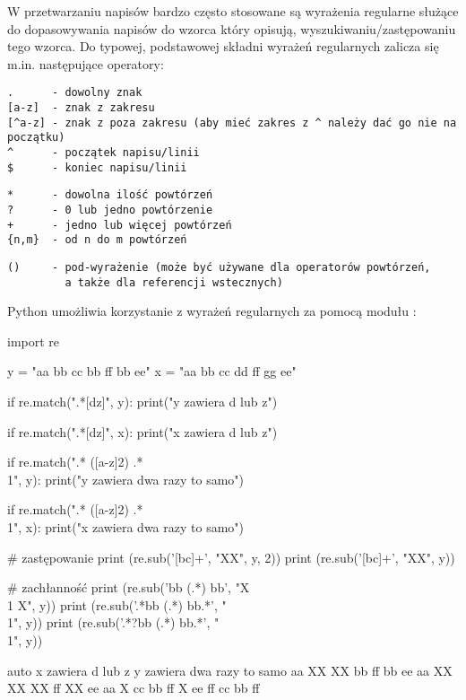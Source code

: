 \documentclass{pdfBooklets}
\begin{document}
W przetwarzaniu napisów bardzo często stosowane są wyrażenia regularne służące do dopasowywania napisów do wzorca który opisują, wyszukiwaniu/zastępowaniu tego wzorca. Do typowej, podstawowej składni wyrażeń regularnych zalicza się m.in. następujące operatory:

\vspace{-6pt}\begin{Verbatim}
.      - dowolny znak
[a-z]  - znak z zakresu
[^a-z] - znak z poza zakresu (aby mieć zakres z ^ należy dać go nie na początku)
^      - początek napisu/linii
$      - koniec napisu/linii
\end{Verbatim}
\vspace{-8pt}\begin{Verbatim}
*      - dowolna ilość powtórzeń
?      - 0 lub jedno powtórzenie
+      - jedno lub więcej powtórzeń
{n,m}  - od n do m powtórzeń
\end{Verbatim}
\vspace{-8pt}\begin{Verbatim}
()     - pod-wyrażenie (może być używane dla operatorów powtórzeń,
         a także dla referencji wstecznych)
\end{Verbatim}

\pagebreak[2]\noindent
Python umożliwia korzystanie z wyrażeń regularnych za pomocą modułu :

\begin{CodeFrame}[python]{0.57\textwidth}
import re

y = "aa bb cc bb ff bb ee"
x = "aa bb cc dd ff gg ee"

if re.match(".*[dz]", y):
  print("y zawiera d lub z")

if re.match(".*[dz]", x):
  print("x zawiera d lub z")

if re.match(".* ([a-z]{2}) .* \\1", y):
  print("y zawiera dwa razy to samo")

if re.match(".* ([a-z]{2}) .* \\1", x):
  print("x zawiera dwa razy to samo")

# zastępowanie
print (re.sub('[bc]+', "XX", y, 2))
print (re.sub('[bc]+', "XX", y))

# zachłanność
print (re.sub('bb (.*) bb', "X \\1 X", y))
print (re.sub('.*bb (.*) bb.*', "\\1", y))
print (re.sub('.*?bb (.*) bb.*', "\\1", y))
\end{CodeFrame}
\begin{CodeFrame}{auto}
x zawiera d lub z
y zawiera dwa razy to samo
aa XX XX bb ff bb ee
aa XX XX XX ff XX ee
aa X cc bb ff X ee
ff
cc bb ff
\end{CodeFrame}
\end{document}
